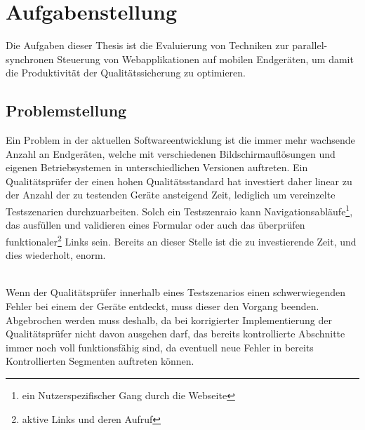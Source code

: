 \chapter{Aufgabenstellung}
Die Aufgaben dieser Thesis ist die Evaluierung von Techniken zur parallel-synchronen Steuerung von Webapplikationen auf mobilen Endgeräten, um damit die Produktivität der Qualitätssicherung zu optimieren.
	\section{Problemstellung}
	Ein Problem in der aktuellen Softwareentwicklung ist die immer mehr wachsende Anzahl an Endgeräten, welche mit 			verschiedenen Bildschirmauflösungen und eigenen Betriebsystemen in unterschiedlichen Versionen auftreten. Ein 				Qualitätsprüfer der einen hohen Qualitätsstandard hat investiert daher linear zu der Anzahl der zu testenden Geräte ansteigend 	Zeit, lediglich um vereinzelte Testszenarien durchzuarbeiten. Solch ein Testszenraio kann Navigationsabläufe\footnote{ein 		Nutzerspezifischer Gang durch die Webseite}, das ausfüllen und validieren eines Formular oder auch das überprüfen 			funktionaler\footnote{aktive Links und deren Aufruf} Links sein. Bereits an dieser Stelle ist die zu investierende Zeit, und dies 		wiederholt, enorm.
	
	\\Wenn der Qualitätsprüfer innerhalb eines Testszenarios einen schwerwiegenden Fehler bei einem der Geräte entdeckt, muss 		dieser den Vorgang beenden. Abgebrochen werden muss deshalb, da bei korrigierter Implementierung der Qualitätsprüfer nicht 	davon ausgehen darf, das bereits kontrollierte Abschnitte immer noch voll funktionsfähig sind, da eventuell neue Fehler in bereits 	Kontrollierten Segmenten auftreten können.
	
